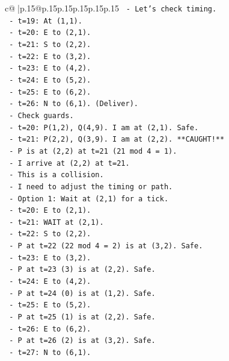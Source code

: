 \documentclass{article}
\begin{document}
{\begin{supertabular}{c@{$\;$}|p{.15\linewidth}@{}p{.15\linewidth}p{.15\linewidth}p{.15\linewidth}p{.15\linewidth}p{.15\linewidth}}
{{{\texttt{    {-} Let's check timing.} \\
\texttt{      {-} t=19: At (1,1).} \\
\texttt{      {-} t=20: E to (2,1).} \\
\texttt{      {-} t=21: S to (2,2).} \\
\texttt{      {-} t=22: E to (3,2).} \\
\texttt{      {-} t=23: E to (4,2).} \\
\texttt{      {-} t=24: E to (5,2).} \\
\texttt{      {-} t=25: E to (6,2).} \\
\texttt{      {-} t=26: N to (6,1). (Deliver).} \\
\texttt{    {-} Check guards.} \\
\texttt{      {-} t=20: P(1,2), Q(4,9). I am at (2,1). Safe.} \\
\texttt{      {-} t=21: P(2,2), Q(3,9). I am at (2,2). **CAUGHT!**} \\
\texttt{        {-} P is at (2,2) at t=21 (21 mod 4 = 1).} \\
\texttt{        {-} I arrive at (2,2) at t=21.} \\
\texttt{        {-} This is a collision.} \\
\texttt{    {-} I need to adjust the timing or path.} \\
\texttt{    {-} Option 1: Wait at (2,1) for a tick.} \\
\texttt{      {-} t=20: E to (2,1).} \\
\texttt{      {-} t=21: WAIT at (2,1).} \\
\texttt{      {-} t=22: S to (2,2).} \\
\texttt{        {-} P at t=22 (22 mod 4 = 2) is at (3,2). Safe.} \\
\texttt{      {-} t=23: E to (3,2).} \\
\texttt{        {-} P at t=23 (3) is at (2,2). Safe.} \\
\texttt{      {-} t=24: E to (4,2).} \\
\texttt{        {-} P at t=24 (0) is at (1,2). Safe.} \\
\texttt{      {-} t=25: E to (5,2).} \\
\texttt{        {-} P at t=25 (1) is at (2,2). Safe.} \\
\texttt{      {-} t=26: E to (6,2).} \\
\texttt{        {-} P at t=26 (2) is at (3,2). Safe.} \\
\texttt{      {-} t=27: N to (6,1).} \\
}}}
\end{supertabular}}
\end{document}
